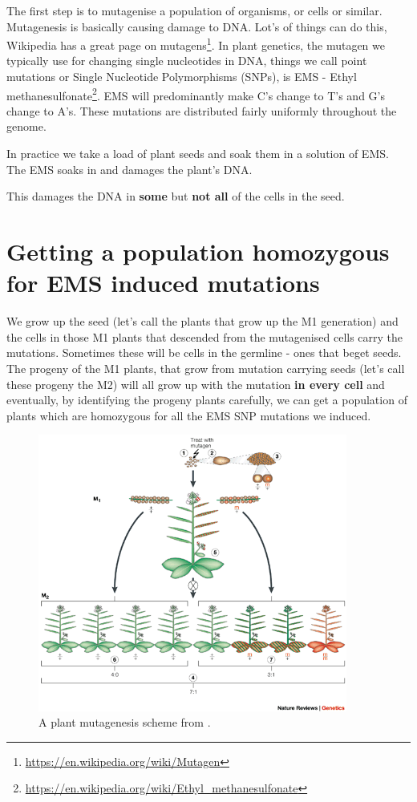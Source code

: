 \documentclass[12pt,]{book}
\let\rmarkdownfootnote\footnote%
\def\footnote{\protect\rmarkdownfootnote}
\renewcommand{\href}[2]{#2\footnote{\url{#1}}}
\begin{document}
The first step is to mutagenise a population of organisms, or cells or
similar. Mutagenesis is basically causing damage to DNA. Lot's of things
can do this, Wikipedia has a great page on
\href{https://en.wikipedia.org/wiki/Mutagen}{mutagens}. In plant
genetics, the mutagen we typically use for changing single nucleotides
in DNA, things we call point mutations or Single Nucleotide
Polymorphisms (SNPs), is EMS -
\href{https://en.wikipedia.org/wiki/Ethyl_methanesulfonate}{Ethyl
methanesulfonate}. EMS will predominantly make C's change to T's and G's
change to A's. These mutations are distributed fairly uniformly
throughout the genome.

In practice we take a load of plant seeds and soak them in a solution of
EMS. The EMS soaks in and damages the plant's DNA.

This damages the DNA in \textbf{some} but \textbf{not all} of the cells
in the seed.

\section{Getting a population homozygous for EMS induced
mutations}\label{getting-a-population-homozygous-for-ems-induced-mutations}

We grow up the seed (let's call the plants that grow up the M1
generation) and the cells in those M1 plants that descended from the
mutagenised cells carry the mutations. Sometimes these will be cells in
the germline - ones that beget seeds. The progeny of the M1 plants, that
grow from mutation carrying seeds (let's call these progeny the M2) will
all grow up with the mutation \textbf{in every cell} and eventually, by
identifying the progeny plants carefully, we can get a population of
plants which are homozygous for all the EMS SNP mutations we induced.



\begin{figure}
\includegraphics[width=4in]{assets/nrg730-i2} \caption{A plant mutagenesis scheme from \citet{Page:2002vm}.}\label{fig:mutagenesis}
\end{figure}
\end{document}
